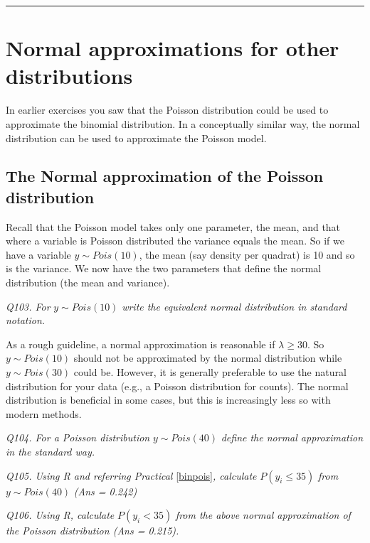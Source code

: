 \documentclass[
  11pt,
  a4paper,
]{book}
\begin{document}
\begin{center}\rule{0.5\linewidth}{0.5pt}\end{center}

\hypertarget{normal-approximations-for-other-distributions}{%
\section{Normal approximations for other distributions}\label{normal-approximations-for-other-distributions}}

In earlier exercises you saw that the Poisson distribution could be used to approximate the binomial distribution. In a conceptually similar way, the normal distribution can be used to approximate the Poisson model.

\hypertarget{the-normal-approximation-of-the-poisson-distribution}{%
\subsection{The Normal approximation of the Poisson distribution}\label{the-normal-approximation-of-the-poisson-distribution}}

Recall that the Poisson model takes only one parameter, the mean, and that where a variable is Poisson distributed the variance equals the mean. So if we have a variable \(y \sim Pois(10)\), the mean (say density per quadrat) is 10 and so is the variance. We now have the two parameters that define the normal distribution (the mean and variance).

\emph{Q103. For} \(y \sim Pois(10)\) \emph{write the equivalent normal distribution in standard notation.}

As a rough guideline, a normal approximation is reasonable if \(\lambda \geq 30\). So \(y \sim Pois(10)\) should not be approximated by the normal distribution while \(y \sim Pois(30)\) could be. However, it is generally preferable to use the natural distribution for your data (e.g., a Poisson distribution for counts). The normal distribution is beneficial in some cases, but this is increasingly less so with modern methods.

\emph{Q104. For a Poisson distribution} \(y \sim Pois(40)\) \emph{define the normal approximation in the standard way.}

\emph{Q105. Using R and referring Practical} \ref{binpois}\emph{, calculate} \(P(y_i \leq 35)\) \emph{from} \(y \sim Pois(40)\) \emph{(Ans = 0.242)}

\emph{Q106. Using R, calculate} \(P(y_i < 35)\) \emph{from the above normal approximation of the Poisson distribution (Ans = 0.215).}
\end{document}
